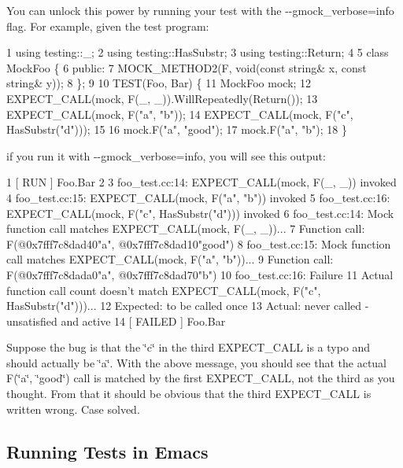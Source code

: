 You can unlock this power by running your test with the {\ttfamily -\/-\/gmock\+\_\+verbose=info} flag. For example, given the test program\+:


\begin{DoxyCode}
1 using testing::\_;
2 using testing::HasSubstr;
3 using testing::Return;
4 
5 class MockFoo \{
6  public:
7   MOCK\_METHOD2(F, void(const string& x, const string& y));
8 \};
9 
10 TEST(Foo, Bar) \{
11   MockFoo mock;
12   EXPECT\_CALL(mock, F(\_, \_)).WillRepeatedly(Return());
13   EXPECT\_CALL(mock, F("a", "b"));
14   EXPECT\_CALL(mock, F("c", HasSubstr("d")));
15 
16   mock.F("a", "good");
17   mock.F("a", "b");
18 \}
\end{DoxyCode}


if you run it with {\ttfamily -\/-\/gmock\+\_\+verbose=info}, you will see this output\+:


\begin{DoxyCode}
1 [ RUN      ] Foo.Bar
2 
3 foo\_test.cc:14: EXPECT\_CALL(mock, F(\_, \_)) invoked
4 foo\_test.cc:15: EXPECT\_CALL(mock, F("a", "b")) invoked
5 foo\_test.cc:16: EXPECT\_CALL(mock, F("c", HasSubstr("d"))) invoked
6 foo\_test.cc:14: Mock function call matches EXPECT\_CALL(mock, F(\_, \_))...
7     Function call: F(@0x7fff7c8dad40"a", @0x7fff7c8dad10"good")
8 foo\_test.cc:15: Mock function call matches EXPECT\_CALL(mock, F("a", "b"))...
9     Function call: F(@0x7fff7c8dada0"a", @0x7fff7c8dad70"b")
10 foo\_test.cc:16: Failure
11 Actual function call count doesn't match EXPECT\_CALL(mock, F("c", HasSubstr("d")))...
12          Expected: to be called once
13            Actual: never called - unsatisfied and active
14 [  FAILED  ] Foo.Bar
\end{DoxyCode}


Suppose the bug is that the {\ttfamily \char`\"{}c\char`\"{}} in the third {\ttfamily E\+X\+P\+E\+C\+T\+\_\+\+C\+A\+LL} is a typo and should actually be {\ttfamily \char`\"{}a\char`\"{}}. With the above message, you should see that the actual {\ttfamily F(\char`\"{}a\char`\"{}, \char`\"{}good\char`\"{})} call is matched by the first {\ttfamily E\+X\+P\+E\+C\+T\+\_\+\+C\+A\+LL}, not the third as you thought. From that it should be obvious that the third {\ttfamily E\+X\+P\+E\+C\+T\+\_\+\+C\+A\+LL} is written wrong. Case solved.

\subsection*{Running Tests in Emacs}

